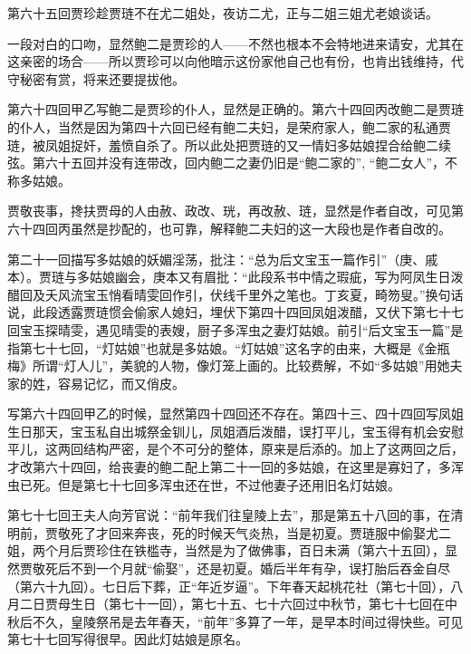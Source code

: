 \par 第六十五回贾珍趁贾琏不在尤二姐处，夜访二尤，正与二姐三姐尤老娘谈话。
\par 一段对白的口吻，显然鲍二是贾珍的人——不然也根本不会特地进来请安，尤其在这亲密的场合——所以贾珍可以向他暗示这份家他自己也有份，也肯出钱维持，代守秘密有赏，将来还要提拔他。
\par 第六十四回甲乙写鲍二是贾珍的仆人，显然是正确的。第六十四回丙改鲍二是贾琏的仆人，当然是因为第四十六回已经有鲍二夫妇，是荣府家人，鲍二家的私通贾琏，被凤姐捉奸，羞愤自杀了。所以此处把贾琏的又一情妇多姑娘捏合给鲍二续弦。第六十五回并没有连带改，回内鲍二之妻仍旧是“鲍二家的”, “鲍二女人”，不称多姑娘。
\par 贾敬丧事，搀扶贾母的人由赦、政改、珖，再改赦、琏，显然是作者自改，可见第六十四回丙虽然是抄配的，也可靠，解释鲍二夫妇的这一大段也是作者自改的。
\par 第二十一回描写多姑娘的妖媚淫荡，批注：“总为后文宝玉一篇作引”（庚、戚本）。贾琏与多姑娘幽会，庚本又有眉批：“此段系书中情之瑕疵，写为阿凤生日泼醋回及夭风流宝玉悄看晴雯回作引，伏线千里外之笔也。丁亥夏，畸笏叟。”换句话说，此段透露贾琏惯会偷家人媳妇，埋伏下第四十四回凤姐泼醋，又伏下第七十七回宝玉探晴雯，遇见晴雯的表嫂，厨子多浑虫之妻灯姑娘。前引“后文宝玉一篇”是指第七十七回，“灯姑娘”也就是多姑娘。“灯姑娘”这名字的由来，大概是《金瓶梅》所谓“灯人儿”，美貌的人物，像灯笼上画的。比较费解，不如“多姑娘”用她夫家的姓，容易记忆，而又俏皮。
\par 写第六十四回甲乙的时候，显然第四十四回还不存在。第四十三、四十四回写凤姐生日那天，宝玉私自出城祭金钏儿，凤姐酒后泼醋，误打平儿，宝玉得有机会安慰平儿，这两回结构严密，是个不可分的整体，原来是后添的。加上了这两回之后，才改第六十四回，给丧妻的鲍二配上第二十一回的多姑娘，在这里是寡妇了，多浑虫已死。但是第七十七回多浑虫还在世，不过他妻子还用旧名灯姑娘。
\par 第七十七回王夫人向芳官说：“前年我们往皇陵上去”，那是第五十八回的事，在清明前，贾敬死了才回来奔丧，死的时候天气炎热，当是初夏。贾琏服中偷娶尤二姐，两个月后贾珍住在铁槛寺，当然是为了做佛事，百日未满（第六十五回），显然贾敬死后不到一个月就“偷娶”，还是初夏。婚后半年有孕，误打胎后吞金自尽（第六十九回）。七日后下葬，正“年近岁逼”。下年春天起桃花社（第七十回），八月二日贾母生日（第七十一回），第七十五、七十六回过中秋节，第七十七回在中秋后不久，皇陵祭吊是去年春天，“前年”多算了一年，是早本时间过得快些。可见第七十七回写得很早。因此灯姑娘是原名。
